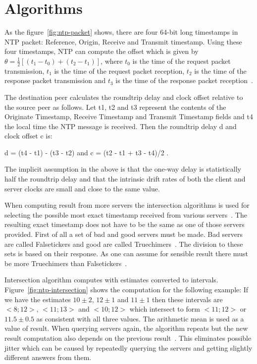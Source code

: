 
\section{Algorithms}
As the figure~\ref{fig:ntp-packet} shows, there are four 64-bit long timestamps
in NTP packet: Reference, Origin, Receive and Transmit timestamp.
Using these four timestamps, NTP can compute
the offset which is given by $\theta = \frac{1}{2}[(t_1 - t_0) + (t_2 - t_1)]$,
where $t_0$ is the time of the request packet transmission,
$t_1$ is the time of the request packet reception,
$t_2$ is the time of the response packet transmission and
$t_3$ is the time of the response packet reception~\cite{ntp-algor}.

The destination peer calculates the roundtrip delay and clock
      offset relative to the source peer as follows.  Let t1, t2 and t3
      represent the contents of the Originate Timestamp, Receive
      Timestamp and Transmit Timestamp fields and t4 the local time the
      NTP message is received.  Then the roundtrip delay d and clock
      offset c is:

         d = (t4 - t1) - (t3 - t2)  and  c = (t2 - t1 + t3 - t4)/2 .

      The implicit assumption in the above is that the one-way delay is
      statistically half the roundtrip delay and that the intrinsic
      drift rates of both the client and server clocks are small and
      close to the same value.

When computing result from more servers the intersection algorithms is used
for selecting the possible most exact timestamp received from various servers~\cite{rfc5905}.
The resulting exact timestamp does not have to be the same
as one of those servers provided.
First of all a set of bad and good servers must be made.
Bad servers are called Falsetickers and good are called Truechimers~\cite{rfc5905}.
The division to these sets is based on their response.
As one can assume for sensible result there must be more Truechimers than Falsetickers~\cite{rfc5905}.

Intersection algorithm computes with estimates converted to intervals.
Figure~\ref{fig:ntp-intersection} shows the computation for the following example:
If we have the estimates $10 \pm 2$, $12 \pm 1$ and $11 \pm 1$
then these intervals are $<8; 12>$, $<11; 13>$ and $<10; 12>$ which
intersect to form $<11; 12>$ or $11.5 \pm 0.5$ as consistent with all three values.
The arithmetic mean is used as a value of result.
When querying servers again, the algorithm repeats but the new result computation
also depends on the previous result~\cite{rfc5905}.
This eliminates possible jitter which can be caused by repeatedly querying the servers
and getting slightly different answers from them.

